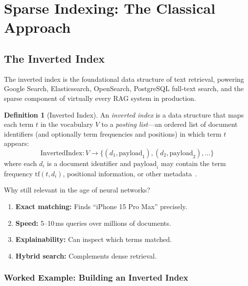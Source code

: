 \documentclass[11pt,a4paper]{article}
\theoremstyle{definition}
\newtheorem{definition}{Definition}[section]
\theoremstyle{plain}
\begin{document}
\section{Sparse Indexing: The Classical Approach}
\label{sec:sparse}

\subsection{The Inverted Index}

The inverted index is the foundational data structure of text retrieval, powering Google Search, Elasticsearch, OpenSearch, PostgreSQL full-text search, and the sparse component of virtually every RAG system in production.

\begin{definition}[Inverted Index]
\label{def:inverted-index}
An \emph{inverted index} is a data structure that maps each term $t$ in the vocabulary $V$ to a \emph{posting list}---an ordered list of document identifiers (and optionally term frequencies and positions) in which term $t$ appears:
\[
\mathrm{InvertedIndex}: V \to \{(d_1, \mathrm{payload}_1), (d_2, \mathrm{payload}_2), \ldots\}
\]
where each $d_i$ is a document identifier and $\mathrm{payload}_i$ may contain the term frequency $\mathrm{tf}(t, d_i)$, positional information, or other metadata~\cite{manning2008introduction}.
\end{definition}

Why still relevant in the age of neural networks?
\begin{enumerate}
    \item \textbf{Exact matching:} Finds ``iPhone 15 Pro Max'' precisely.
    \item \textbf{Speed:} 5--10\,ms queries over millions of documents.
    \item \textbf{Explainability:} Can inspect which terms matched.
    \item \textbf{Hybrid search:} Complements dense retrieval.
\end{enumerate}

\subsubsection{Worked Example: Building an Inverted Index}
\end{document}
